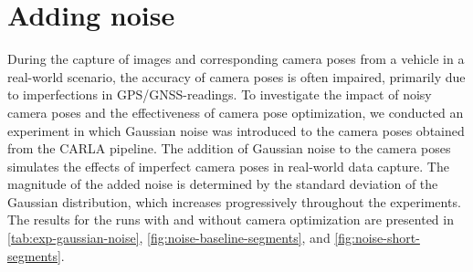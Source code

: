\section{Adding noise}

During the capture of images and corresponding camera poses from a vehicle in a real-world scenario, the accuracy of camera poses is often impaired, primarily due to imperfections in GPS/GNSS-readings. To investigate the impact of noisy camera poses and the effectiveness of camera pose optimization, we conducted an experiment in which Gaussian noise was introduced to the camera poses obtained from the CARLA pipeline. The addition of Gaussian noise to the camera poses simulates the effects of imperfect camera poses in real-world data capture. The magnitude of the added noise is determined by the standard deviation of the Gaussian distribution, which increases progressively throughout the experiments. The results for the runs with and without camera optimization are presented in \autoref{tab:exp-gaussian-noise}, \autoref{fig:noise-baseline-segments}, and \autoref{fig:noise-short-segments}.


